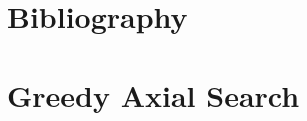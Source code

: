 \documentclass[a4paper, 5p, sort&compress]{elsarticle}%
\begin{document}
{%





\section*{Bibliography}




\appendix

\renewcommand{\thesection}{Appendix \Roman{section}}
\section{Greedy Axial Search}
\label{sec:greedy-axial-search}

}
\end{document}
